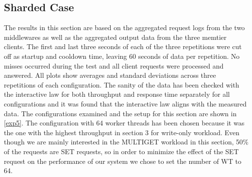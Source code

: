 \documentclass[11pt,a4paper]{article}
\begin{document}
\subsection{Sharded Case} \label{sec5.1}

The results in this section are based on the aggregated request logs from the two middlewares as well as the aggregated output data from the three memtier clients. The first and last three seconds of each of the three repetitions were cut off as startup and cooldown time, leaving 60 seconds of data per repetition. No misses occurred during the test and all client requests were processed and answered. All plots show averages and standard deviations across three repetitions of each configuration. The sanity of the data has been checked with the interactive law for both throughput and response time separately for all configurations and it was found that the interactive law aligns with the measured data. The configurations examined and the setup for this section are shown in \autoref{exp5}. The configuration with 64 worker threads has been chosen because it was the one with the highest throughput in section 3 for write-only workload. Even though we are mainly interested in the MULTIGET workload in this section, 50\% of the requests are SET requests, so in order to minimize the effect of the SET request on the performance of our system we chose to set the number of WT to 64.
\end{document}

